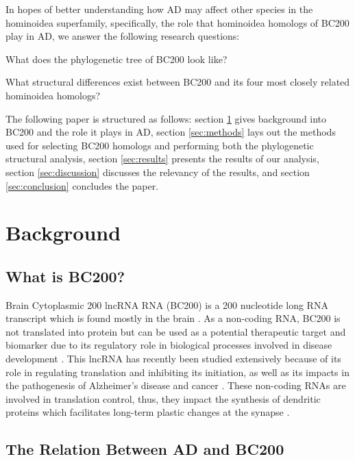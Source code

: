 \documentclass[conference]{IEEEtran}
\begin{document}
In hopes of better understanding how AD may affect other species in the hominoidea superfamily, specifically, the role that hominoidea homologs of BC200 play in AD, we answer the following research questions:

\begin{questions}
  \item What does the phylogenetic tree of BC200 look like?
  \item What structural differences exist between BC200 and its four most closely related hominoidea homologs?
\end{questions}

The following paper is structured as follows: section \ref{sec:background} gives background into BC200 and the role it plays in AD, section \ref{sec:methods} lays out the methods used for selecting BC200 homologs and performing both the phylogenetic structural analysis, section \ref{sec:results} presents the results of our analysis, section \ref{sec:discussion} discusses the relevancy of the results, and section \ref{sec:conclusion} concludes the paper.

\section{Background}\label{sec:background}

\subsection{What is BC200?}

Brain Cytoplasmic 200 lncRNA RNA (BC200) is a 200 nucleotide long RNA transcript which is found mostly in the brain \cite{tiedge1993primary}. 
As a non-coding RNA, BC200 is not translated into protein but can be used as a potential therapeutic target and biomarker due to its regulatory role in biological processes involved in disease development \cite{zhang2021role,mus2007dendritic}. 
This lncRNA has recently been studied extensively because of its role in regulating translation and inhibiting its initiation, as well as its impacts in the pathogenesis of Alzheimer's disease and cancer \cite{zhang2021role,tiedge1993primary}. 
These  non-coding RNAs are involved in translation control, thus, they impact the synthesis of dendritic proteins which facilitates long-term plastic changes at the synapse \cite{mus2007dendritic}.

\subsection{The Relation Between AD and BC200}
\end{document}
